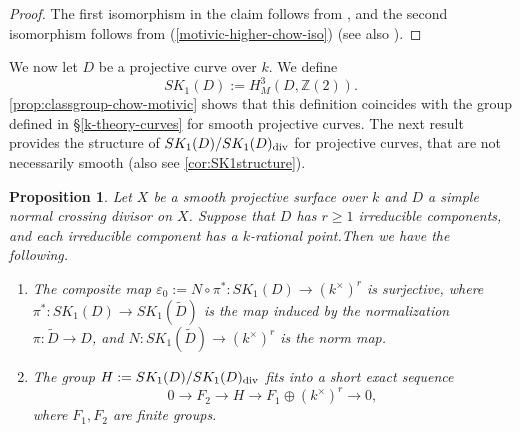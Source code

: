 \documentclass[12pt]{amsart}
\newtheorem{prop}[prop]{Proposition}
\theoremstyle{remark}
\renewcommand{\1}{{\mathbb{S}}}
\newcommand{\<}{\langle}
\renewcommand{\>}{\rangle}
\newcommand{\dv}{{\rm div}}
\begin{document}
\begin{proof}
The first isomorphism in the claim follows from \cite[Theorem 2.5]{Lan}, and the second isomorphism follows from  (\ref{motivic-higher-chow-iso}) (see also \cite[Appendix]{AS}).

\end{proof}

We now let $D$ be a projective curve over $k$. We define
\begin{equation}
    SK_{1}(D) := H_{M}^{3}(D, \mathbb{Z}(2)).
\end{equation}
 \autoref{prop:classgroup-chow-motivic} shows that this definition coincides with the group defined in \S\ref{k-theory-curves} for smooth projective curves. The next result provides the structure of $SK_{1}(D)/SK_{1}(D)_{\dv}$ for projective curves, that are not necessarily smooth (also see \autoref{cor:SK1structure}).  



\begin{prop}\label{prop:SK1} Let $X$ be a smooth projective surface over $k$ and $D$ a simple normal crossing divisor on $X$. Suppose that $D$ has $r\geq 1$ irreducible components, and each irreducible component has a $k$-rational point.Then we have the following.

\begin{enumerate}
    \item  The composite map $\varepsilon_{0} := N \circ \pi^{*} \colon SK_{1}(D) \to (k^{\times})^{r}$ is surjective, where $\pi^{*}:SK_{1}(D) \rightarrow SK_{1}(\tilde{D})$ is the map induced by the normalization $\pi \colon \tilde{D} \to D$, and $N \colon SK_{1}(\tilde{D}) \to (k^{\times})^{r}$ is the norm map.





\item The group $H:=SK_1(D)/SK_1(D)_{\dv}$ fits into a short exact sequence \[0\to F_2\to H\to F_1\oplus (k^\times)^r\to 0,\] where $F_1, F_2$ are finite groups. 
\end{enumerate}

\end{prop} 
\end{document}

